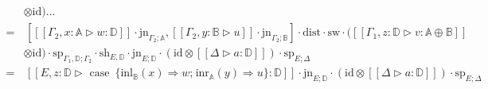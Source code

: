 \begin{equation*}
\begin{split}
& \otimes \text{id}) ... \\
= & \hspace{2pt}\left[[\![ \Gamma_2, x:\mathbb{A} \triangleright w : \mathbb{D}]\!] \cdot \text{jn}_{ \Gamma_2;\mathbb{A}},[\![ \Gamma_2, y:\mathbb{B} \triangleright u ]\!] \cdot \text{jn}_{ \Gamma_2;\mathbb{B}}\right] \cdot \text{dist} \cdot \text{sw} \cdot ([\![\Gamma_1, z:\mathbb{D} \triangleright v : \mathbb{A} \oplus \mathbb{B}  ]\!] \\
  & \otimes \text{id})  \cdot \text{sp}_{\Gamma_1,\mathbb{D};\Gamma_2}  \cdot \text{sh}_{E,\mathbb{D}} \cdot \text{jn}_{E; \mathbb{D}} \cdot (\text{id} \otimes [\![ \Delta \triangleright a:\mathbb{D}  ]\!] ) \cdot \text{sp}_{E;\Delta} \\
= & \hspace{2pt} [\![E,  z:\mathbb{D} \triangleright \text{ case }  \hspace{2pt}  \{\text{inl}_{\mathbb{B}} (x) \Rightarrow w ; \hspace{1pt} \text{inr}_{\mathbb{A}} (y) \Rightarrow u\}: \mathbb{D}]\!]  \cdot \text{jn}_{E; \mathbb{D}} \cdot (\text{id} \otimes [\![ \Delta \triangleright a:\mathbb{D}  ]\!] ) \cdot \text{sp}_{E;\Delta} \\
\end{split}
  \end{equation*}

  \vspace{5 pt}

